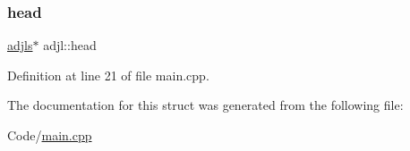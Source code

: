 \subsubsection{\texorpdfstring{head}{head}}
{\footnotesize\ttfamily \hyperlink{structadjls}{adjls}$\ast$ adjl\+::head}



Definition at line 21 of file main.\+cpp.



The documentation for this struct was generated from the following file\+:\begin{DoxyCompactItemize}
\item 
Code/\hyperlink{main_8cpp}{main.\+cpp}\end{DoxyCompactItemize}
